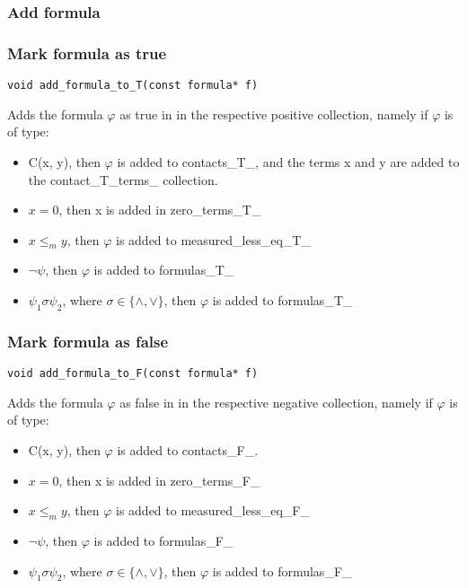 \documentclass{article}
\begin{document}
			\subsubsection*{Add formula}
			\subsubsection*{Mark formula as true}
				\begin{lstlisting}
void add_formula_to_T(const formula* f)
				\end{lstlisting}
				Adds the formula $\varphi$ as true in in the respective positive collection, namely
				if $\varphi$ is of type:
				\begin{itemize}
					\item C(x, y), then $\varphi$ is added to contacts\_T\_, and the terms x and y are added to the contact\_T\_terms\_ collection.
					\item $x = 0$, then x is added in zero\_terms\_T\_
					\item $x \le_m y$, then $\varphi$ is added to measured\_less\_eq\_T\_
					\item $\neg \psi$, then $\varphi$ is added to formulas\_T\_
					\item $\psi_1 \sigma \psi_2$, where $\sigma \in \{\wedge, \vee\}$, then $\varphi$ is added to formulas\_T\_
				\end{itemize}
			\subsubsection*{Mark formula as false}
				\begin{lstlisting}
void add_formula_to_F(const formula* f)
				\end{lstlisting}
				Adds the formula $\varphi$ as false in in the respective negative collection, namely
				if $\varphi$ is of type:
				\begin{itemize}
					\item C(x, y), then $\varphi$ is added to contacts\_F\_.
					\item $x = 0$, then x is added in zero\_terms\_F\_
					\item $x \le_m y$, then $\varphi$ is added to measured\_less\_eq\_F\_
					\item $\neg \psi$, then $\varphi$ is added to formulas\_F\_
					\item $\psi_1 \sigma \psi_2$, where $\sigma \in \{\wedge, \vee\}$, then $\varphi$ is added to formulas\_F\_
				\end{itemize}
\end{document}
